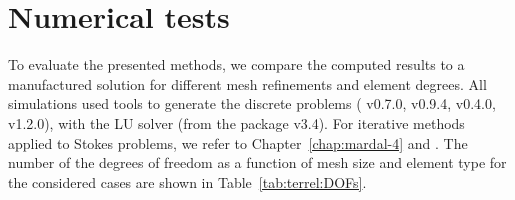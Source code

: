 \section{Numerical tests}
\label{sec:terrel:Results}

To evaluate the presented methods, we compare the computed results to
a manufactured solution for different mesh refinements and element
degrees. All simulations used \fenics{} tools to generate the
discrete problems (\ffc{} v0.7.0, \dolfin{} v0.9.4, \ufl{} v0.4.0,
\ufc{} v1.2.0), with the  LU solver (from the
 package v3.4).  For iterative methods
applied to Stokes problems, we refer to Chapter~\ref{chap:mardal-4}
and \citet{ElmanSilvesterWathen2005}.  The number of the degrees of
freedom as a function of mesh size and element type for the considered
cases are shown in Table~\ref{tab:terrel:DOFs}.

